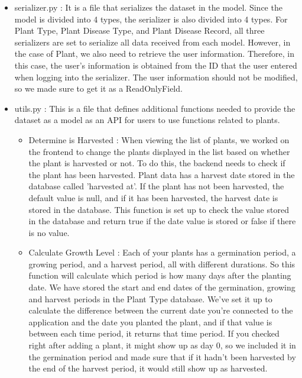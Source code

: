 \documentclass[conference, a4paper]{IEEEtran}
\begin{document}
\begin{enumerate}
\begin{itemize}
\begin{itemize}
        \item serializer.py : It is a file that serializes the dataset in the model. Since the model is divided into 4 types, the serializer is also divided into 4 types. For Plant Type, Plant Disease Type, and Plant Disease Record, all three serializers are set to serialize all data received from each model. However, in the case of Plant, we also need to retrieve the user information. Therefore, in this case, the user's information is obtained from the ID that the user entered when logging into the serializer. The user information should not be modified, so we made sure to get it as a ReadOnlyField. \\
        \item utils.py : This is a file that defines additional functions needed to provide the dataset as a model as an API for users to use functions related to plants.
        \begin{itemize}
            \item Determine is Harvested : When viewing the list of plants, we worked on the frontend to change the plants displayed in the list based on whether the plant is harvested or not. To do this, the backend needs to check if the plant has been harvested. Plant data has a harvest date stored in the database called 'harvested at'. If the plant has not been harvested, the default value is null, and if it has been harvested, the harvest date is stored in the database. This function is set up to check the value stored in the database and return true if the date value is stored or false if there is no value. \\
            \item Calculate Growth Level : Each of your plants has a germination period, a growing period, and a harvest period, all with different durations. So this function will calculate which period is how many days after the planting date. We have stored the start and end dates of the germination, growing and harvest periods in the Plant Type database. We've set it up to calculate the difference between the current date you're connected to the application and the date you planted the plant, and if that value is between each time period, it returns that time period. If you checked right after adding a plant, it might show up as day 0, so we included it in the germination period and made sure that if it hadn't been harvested by the end of the harvest period, it would still show up as harvested. \\

\end{itemize}
\end{itemize}
\end{itemize}
\end{enumerate}
\end{document}
